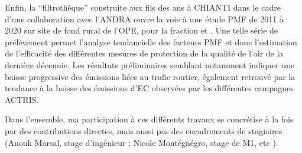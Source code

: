 
Enfin, la ``filtrothèque'' construite aux fils des ans à CHIANTI dans le cadre d'une
collaboration avec l'ANDRA ouvre la voie à une étude PMF de 2011 à 2020 sur site de fond
rural de l'OPE, pour la fraction \PMdix{} et \PMdc. Une telle série de prélèvement permet
l'analyse tendancielle des facteurs PMF et donc l'estimation de l'efficacité des
différentes mesures de protection de la qualité de l'air de la dernière décennie. Les
résultats préliminaires semblant notamment indiquer une baisse progressive des émissions
liées au trafic routier, également retrouvé par la tendance à la baisse des émissions d'EC
observées par les différentes campagnes ACTRIS.



Dans l'ensemble, ma participation à ces différents travaux se concrétise à la fois par
des contributions directes, mais aussi pas des encadrements de stagiaires (Anouk Marsal,
stage d'ingénieur ; Nicole Montégnégro, stage de M1, etc ).

%

